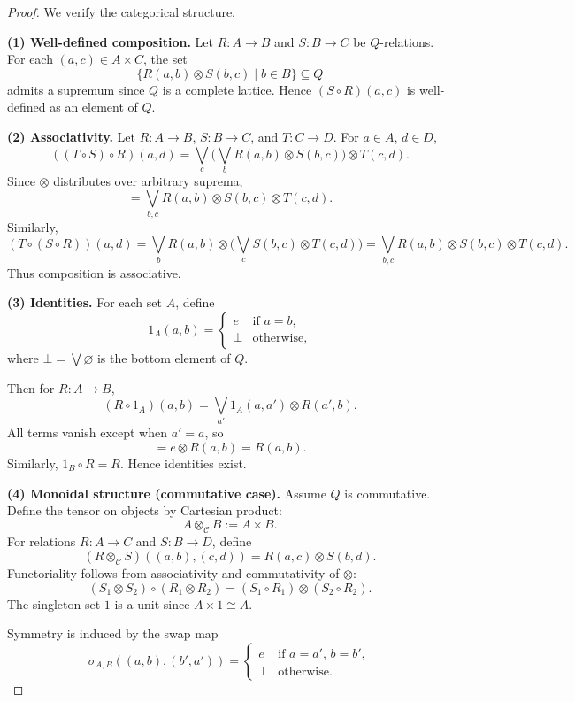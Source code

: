 \begin{proof}
	We verify the categorical structure.

	\medskip
	\noindent
	\textbf{(1) Well-defined composition.}
	Let $R:A \to B$ and $S:B \to C$ be $Q$-relations.
	For each $(a,c) \in A \times C$, the set
	\[
		\{ R(a,b)\otimes S(b,c) \mid b \in B \}
		\subseteq Q
	\]
	admits a supremum since $Q$ is a complete lattice.
	Hence $(S\circ R)(a,c)$ is well-defined as an element of $Q$.

	\medskip
	\noindent
	\textbf{(2) Associativity.}
	Let $R:A\to B$, $S:B\to C$, and $T:C\to D$.
	For $a\in A$, $d\in D$,
	\[
		((T\circ S)\circ R)(a,d)
		=
		\bigvee_{c}
		\Big(
		\bigvee_{b} R(a,b)\otimes S(b,c)
		\Big)
		\otimes T(c,d).
	\]
	Since $\otimes$ distributes over arbitrary suprema,
	\[
		=
		\bigvee_{b,c}
		R(a,b)\otimes S(b,c)\otimes T(c,d).
	\]
	Similarly,
	\[
		(T\circ (S\circ R))(a,d)
		=
		\bigvee_{b}
		R(a,b)\otimes
		\Big(
		\bigvee_{c} S(b,c)\otimes T(c,d)
		\Big)
		=
		\bigvee_{b,c}
		R(a,b)\otimes S(b,c)\otimes T(c,d).
	\]
	Thus composition is associative.

	\medskip
	\noindent
	\textbf{(3) Identities.}
	For each set $A$, define
	\[
		1_A(a,b)
		=
		\begin{cases}
			e    & \text{if } a=b,   \\
			\bot & \text{otherwise},
		\end{cases}
	\]
	where $\bot = \bigvee \varnothing$ is the bottom element of $Q$.

	Then for $R:A\to B$,
	\[
		(R\circ 1_A)(a,b)
		=
		\bigvee_{a'}
		1_A(a,a')\otimes R(a',b).
	\]
	All terms vanish except when $a'=a$, so
	\[
		=
		e \otimes R(a,b)
		=
		R(a,b).
	\]
	Similarly, $1_B\circ R = R$. Hence identities exist.

	\medskip
	\noindent
	\textbf{(4) Monoidal structure (commutative case).}
	Assume $Q$ is commutative.
	Define the tensor on objects by Cartesian product:
	\[
		A\otimes_{\mathcal{C}} B := A\times B.
	\]
	For relations $R:A\to C$ and $S:B\to D$, define
	\[
		(R\otimes_{\mathcal{C}} S)((a,b),(c,d))
		=
		R(a,c)\otimes S(b,d).
	\]
	Functoriality follows from associativity and commutativity of $\otimes$:
	\[
		(S_1\otimes S_2)\circ (R_1\otimes R_2)
		=
		(S_1\circ R_1)\otimes (S_2\circ R_2).
	\]
	The singleton set $1$ is a unit since $A\times 1 \cong A$.

	Symmetry is induced by the swap map
	\[
		\sigma_{A,B}((a,b),(b',a'))=
		\begin{cases}
			e    & \text{if } a=a',\, b=b', \\
			\bot & \text{otherwise}.
		\end{cases}
	\]


\end{proof}
